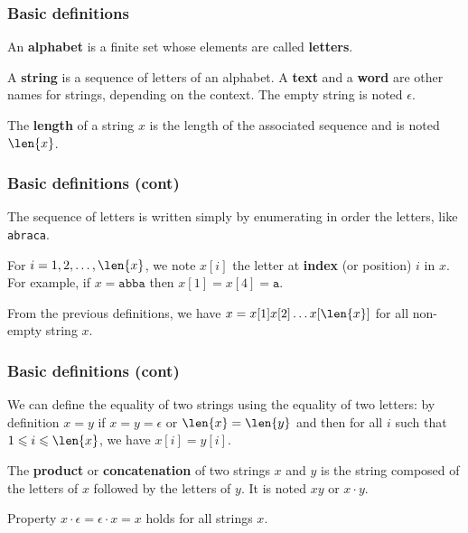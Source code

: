 
%
\begin{frame}
\frametitle{Basic definitions}

An \textbf{alphabet} is a finite set whose elements are called
\textbf{letters}.

\bigskip

A \textbf{string} is a sequence of letters of an alphabet. A
\textbf{text} and a \textbf{word} are other names for strings,
depending on the context. The empty string is noted \(\epsilon\).

\bigskip

The \textbf{length} of a string \(x\) is the length of the associated
sequence and is noted \(\len{x}\).

\end{frame}


%
\begin{frame}
\frametitle{Basic definitions (cont)}

The sequence of letters is written simply by enumerating in order the
letters, like \texttt{abraca}.

\bigskip

For \(i = 1, 2, \ldots, \len{x}\), we note \(x[i]\) the letter at
\textbf{index} (or position) \(i\) in \(x\). For example, if \(x =
\texttt{abba}\) then \(x[1] = x[4] = \texttt{a}\).

\bigskip

From the previous definitions, we have \(x = x[1] x[2] \ldots
x[\len{x}]\) for all non-empty string \(x\).

\end{frame}

%
\begin{frame}
\frametitle{Basic definitions (cont)}

We can define the equality of two strings using the equality of two
letters: by definition \(x = y\) if \(x = y = \epsilon\) or \(\len{x}
= \len{y}\) and then for all \(i\) such that \(1 \leqslant i \leqslant
\len{x}\), we have \(x[i] = y[i]\).

\bigskip

The \textbf{product} or \textbf{concatenation} of two strings \(x\)
and \(y\) is the string composed of the letters of \(x\) followed by
the letters of \(y\). It is noted \(xy\) or \(x \cdot y\).

\bigskip

Property \(x \cdot \epsilon = \epsilon \cdot x = x\) holds for all
strings \(x\).

\end{frame}


